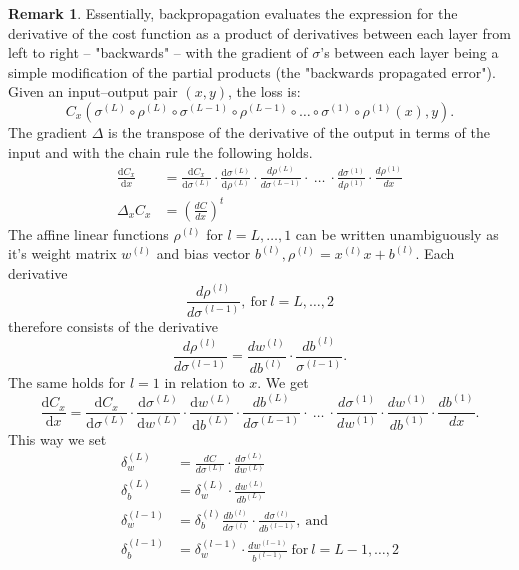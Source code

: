 \documentclass{article}
\theoremstyle{definition}
\newtheorem{remark}[theorem]{Remark}
\begin{document}
\begin{remark}
\label{com:back_prop_madness}
Essentially, backpropagation evaluates the expression for the derivative of the cost function as a product of derivatives between each layer from left to right – "backwards" – with the gradient of $\sigma$'s between each layer being a simple modification of the partial products (the "backwards propagated error").
Given an input–output pair $(x,y)$, the loss is:
$$C_{x}(\sigma^{(L)} \circ \rho^{(L)} \circ \sigma^{(L-1)} \circ \rho^{(L-1)} \circ \dots \circ \sigma^{(1)} \circ \rho^{(1)}(x), y).$$
The gradient $\Delta$ is the transpose of the derivative of the output in terms of the input and with the chain rule the following holds.
\begin{align*}
\frac{\mathrm d C_{x}}{\mathrm d x} &= \frac{\mathrm d C_{x}}{\mathrm d \sigma^{(L)}} \cdot \frac{\mathrm d \sigma^{(L)}}{\mathrm d \rho^{(L)}} \cdot \frac{d \rho^{(L)}}{d \sigma^{(L-1)}} \cdot \ \ldots \ \cdot \frac{d \sigma^{(1)}}{d \rho^{(1)}} \cdot \frac{d \rho^{(1)}}{dx}\\
\Delta_{x} C_{x} &= \left(\frac{dC}{dx}\right)^{t}
\end{align*}
The affine linear functions $\rho^{(l)}$ for $l=L, \dots , 1$ can be written unambiguously as it's weight matrix $w^{(l)}$ and bias vector $b^{(l)}, \rho^{(l)} = x^{(l)} x + b^{(l)}$. Each derivative 
$$\frac{d \rho^{(l)}}{d \sigma^{(l-1)}}, \ \text{for} \ l=L, \dots, 2$$ therefore consists of the derivative 
$$\frac{d \rho^{(l)}}{d \sigma^{(l-1)}} = \frac{d w^{(l)}}{d b^{(l)}} \cdot \frac{d b^{(l)}}{\sigma^{(l-1)}}.$$ 
The same holds for $l = 1$ in relation to $x$. We get
$$\frac{\mathrm d C_{x}}{\mathrm d x} = \frac{\mathrm d C_{x}}{\mathrm d \sigma^{(L)}} \cdot \frac{\mathrm d \sigma^{(L)}}{\mathrm d w^{(L)}} \cdot \frac{\mathrm d w^{(L)}}{\mathrm d b^{(L)}} \cdot \frac{d b^{(L)}}{d \sigma^{(L-1)}} \cdot \ \ldots \ \cdot \frac{d \sigma^{(1)}}{d w^{(1)}} \cdot \frac{d w^{(1)}}{d b^{(1)}} \cdot \frac{d b^{(1)}}{dx}.$$
This way we set
\begin{align*}
\delta^{(L)}_{w} &= \frac{d C}{d \sigma^{(L)}} \cdot \frac{d \sigma^{(L)}}{d w^{(L)}} \\
\delta^{(L)}_{b} &= \delta^{(L)}_{w} \cdot \frac{d w^{(L)}}{d b^{(L)}} \\
\delta^{(l-1)}_{w} &= \delta^{(l)}_{b} \frac{d b^{(l)}}{d \sigma^{(l)}} \cdot \frac{d \sigma^{(l)}}{d b^{(l-1)}}, \ \text{and} \\
\delta^{(l-1)}_{b} &= \delta^{(l-1)}_{w} \cdot \frac{d w^{(l-1)}}{b^{(l-1)}} \ \text{for} \ l=L-1, \dots, 2 \\

\end{align*}
\end{remark}
\end{document}
